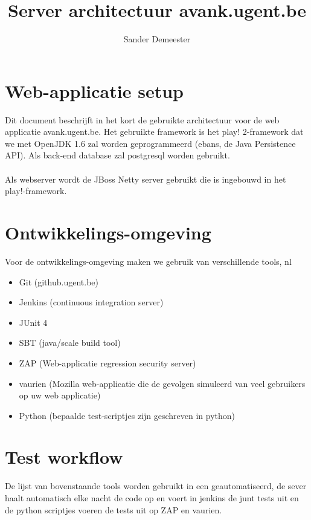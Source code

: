 \documentclass[10pt,a4paper]{report}
\author{Sander Demeester}
\begin{document}
\title{Server architectuur avank.ugent.be}
\section*{Web-applicatie setup}
Dit document beschrijft in het kort de gebruikte architectuur voor de web applicatie avank.ugent.be.
Het gebruikte framework is het play! 2-framework dat we met OpenJDK 1.6 zal worden geprogrammeerd (ebans, de Java Persistence API). Als back-end database zal postgresql worden gebruikt.\\
\\
Als webserver wordt de JBoss Netty server gebruikt die is ingebouwd in het play!-framework.
\section*{Ontwikkelings-omgeving}
Voor de ontwikkelings-omgeving maken we gebruik van verschillende tools, nl
\begin{itemize}
\item Git (github.ugent.be)
\item Jenkins (continuous integration server)
\item JUnit 4
\item SBT (java/scale build tool)
\item ZAP (Web-applicatie regression security server)
\item vaurien (Mozilla web-applicatie die de gevolgen simuleerd van veel gebruikers op uw web applicatie)
\item Python (bepaalde test-scriptjes zijn geschreven in python)
\end{itemize}
\section*{Test workflow}
De lijst van bovenstaande tools worden gebruikt in een geautomatiseerd, de sever haalt automatisch elke nacht de code op en voert in jenkins de junt tests uit en de python scriptjes voeren de tests uit op ZAP en vaurien.
\end{document}

